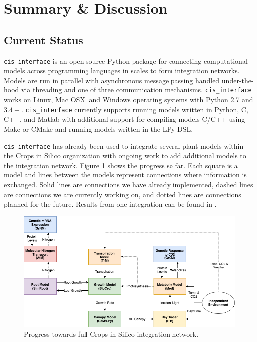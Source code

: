 \documentclass[journal]{IEEEtran}
\newcommand{\todo}[1]{{\color{red}{#1}}}
\newcommand{\cis}{{\tt cis\_interface}{}}
\begin{document}
\section{Summary \& Discussion}\label{S:discuss}

\subsection{Current Status}\label{SS:current}
%
{\cis} is an open-source Python package for connecting computational models across programming languages in scales to form integration networks. Models are run in parallel with asynchronous message passing handled under-the-hood via threading and one of three communication mechanisms. {\cis} works on Linux, Mac OSX, and Windows operating systems with Python 2.7 and $3.4+$. {\cis} currently supports running models written in Python, C, C++, and Matlab with additional support for compiling models C/C++ using Make \citep{Stallman2004} or CMake \citep{Martin2006} and running models written in the LPy \citep{Boudon2012} DSL.

{\cis} has already been used to integrate several plant models within the Crops in Silico organization with ongoing work to add additional models to the integration network. Figure \ref{fig:network} shows the progress so far. Each square is a model and lines between the models represent connections where information is exchanged. Solid lines are connections we have already implemented, dashed lines are connections we are currently working on, and dotted lines are connections planned for the future. Results from one integration can be found in \todo{cite Kavya/Yu}.
%
\ifinclfig
 	\begin{figure}[htbp]
	\begin{center}
	\includegraphics[width=\columnwidth,keepaspectratio]{./images/CiS-BioCro-Planned.png}
	\caption{Progress towards full Crops in Silico integration network.}
	\label{fig:network}
	\end{center}
	\end{figure}
\fi
%
\todo{more here? teaser results?}
\end{document}
